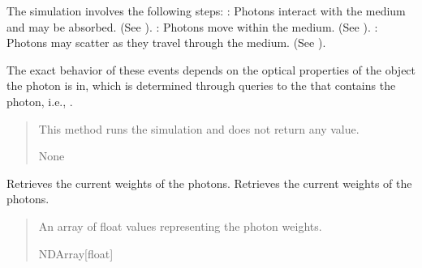 \documentclass[letterpaper,10pt,english]{sphinxmanual}
\begin{document}
\begin{fulllineitems}
\begin{fulllineitems}
\sphinxAtStartPar
The simulation involves the following steps:
\sphinxhyphen{} : Photons interact with the medium and may be absorbed. (See ).
\sphinxhyphen{} : Photons move within the medium. (See ).
\sphinxhyphen{} : Photons may scatter as they travel through the medium. (See ).

\sphinxAtStartPar
The exact behavior of these events depends on the optical properties of the  object the photon is in,
which is determined through queries to the  that contains the photon, i.e., .
\begin{quote}\begin{description}
\sphinxAtStartPar
This method runs the simulation and does not return any value.

\sphinxAtStartPar
None

\end{description}\end{quote}

\end{fulllineitems}


\begin{fulllineitems}
\label{\detokenize{generated/photon_canon.optics:photon_canon.optics.Photon.weights}}
\pysigstartsignatures
\pysigline
{}
\pysigstopsignatures
\sphinxAtStartPar
Retrieves the current weights of the photons.
Retrieves the current weights of the photons.
\begin{quote}\begin{description}
\sphinxAtStartPar
An array of float values representing the photon weights.

\sphinxAtStartPar
NDArray{[}float{]}

\end{description}\end{quote}

\end{fulllineitems}


\end{fulllineitems}
\end{document}
